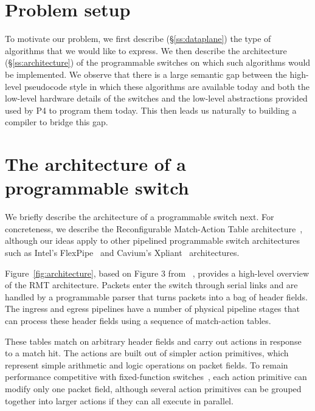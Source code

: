 \section{Problem setup}
\label{s:context}

To motivate our problem, we first describe (\S\ref{ss:dataplane}) the type of
algorithms that we would like \pktlangauage{} to express. We then describe the
architecture (\S\ref{ss:architecture}) of the programmable switches on which
such algorithms would be implemented. We observe that there is a large semantic
gap between the high-level pseudocode style in which these algorithms are
available today and both the low-level hardware details of the switches and the
low-level abstractions provided used by P4 to program them today. This then
leads us naturally to building a compiler to bridge this gap.

\section{The architecture of a programmable switch}
\label{s:architecture}
We briefly describe the architecture of a programmable switch next. For
concreteness, we describe the Reconfigurable Match-Action Table
architecture~\cite{rmt}, although our ideas apply to other pipelined
programmable switch architectures such as Intel's FlexPipe~\cite{flexpipe} and
Cavium's Xpliant~\cite{xpliant} architectures.

Figure~\ref{fig:architecture}, based on Figure 3 from ~\cite{rmt}, provides a
high-level overview of the RMT architecture. Packets enter the switch through
serial links and are handled by a programmable parser that turns packets into a
bag of header fields. The ingress and egress pipelines have a number of
physical pipeline stages that can process these header fields using a sequence
of match-action tables.

These tables match on arbitrary header fields and carry out actions in response
to a match hit.  The actions are built out of simpler action primitives, which
represent simple arithmetic and logic operations on packet fields. To remain
performance competitive with fixed-function switches~\cite{mellanox, broadcom},
each action primitive can modify only one packet field, although several action
primitives can be grouped together into larger actions if they can all execute
in parallel.

